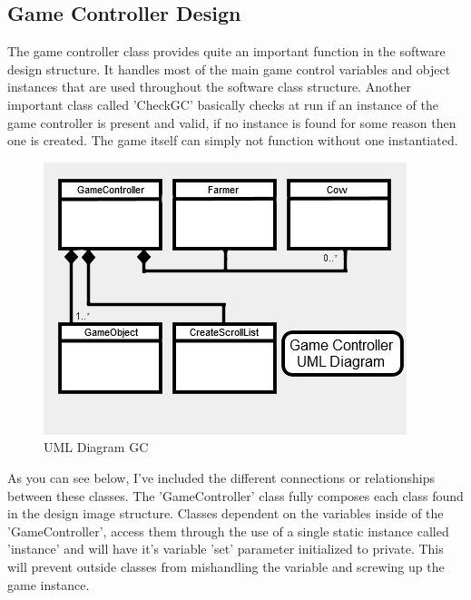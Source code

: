 \subsection{Game Controller Design}
The game controller class provides quite an important function in the software design structure. It handles most of the main game control variables and object instances that are used throughout the software class structure. Another important class called 'CheckGC' basically checks at run if an instance of the game controller is present and valid, if no instance is found for some reason then one is created. The game itself can simply not function without one instantiated.
\begin{figure}[!ht]
	\caption{UML Diagram GC}
	\centering
	\includegraphics{img/gc_uml.png}
\end{figure}
As you can see below, I've included the different connections or relationships between these classes. The 'GameController' class fully composes each class found in the design image structure. Classes dependent on the variables inside of the 'GameController', access them through the use of a single static instance called 'instance' and will have it's variable 'set' parameter initialized to private. This will prevent outside classes from mishandling the variable and screwing up the game instance.
